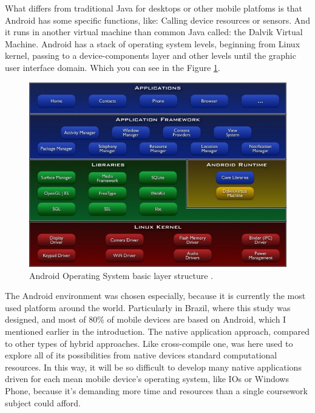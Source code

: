 What differs from traditional Java for desktops or other mobile platfoms is that Android has some specific functions, like: Calling device resources or sensors.  And it runs in another virtual machine than common Java called: the Dalvik Virtual Machine. Android has a stack of operating system levels, beginning from Linux kernel, passing to a device-components layer and other levels until the graphic user interface domain. Which you can see in the Figure \ref{android}.
		
		\begin{figure}[htp]
			\begin{center}
				\includegraphics[scale=0.65]{chapters/desenvolvimento/img/android.jpeg}
				\caption{Android Operating System basic layer structure \citep{1_fundamentals_2015}.}
				\label{android}
			\end{center}
		\end{figure}
		
The Android environment was chosen especially, because it is currently the most used platform around the world. Particularly in Brazil, where this study was designed, and most of 80\% of mobile devices are based on  Android, which I mentioned earlier in the introduction. The native application approach, compared to other types of hybrid approaches. Like cross-compile one, was here used to explore all of its possibilities from native devices standard computational resources. In this way, it will be so difficult to develop many native applications driven for each mean mobile device's operating system, like IOs or Windows Phone, because it’s demanding more time and resources than a single coursework subject could afford.

